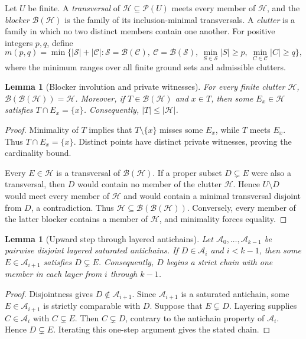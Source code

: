 \documentclass[a4paper,fleqn,longmktitle]{cas-sc}
\newtheorem{lemma}[theorem]{Lemma}
\theoremstyle{definition}
\theoremstyle{remark}
\newcommand{\powerset}{\mathcal{P}}
\newcommand{\blocker}{\mathcal{B}}
\begin{document}
Let $U$ be finite.  A \emph{transversal} of
$\mathcal H\subseteq\powerset(U)$ meets every member of $\mathcal H$, and the
\emph{blocker} $\blocker(\mathcal H)$ is the family of its inclusion-minimal
transversals.  A \emph{clutter} is a family in which no two distinct members
contain one another.  For positive integers $p,q$, define
\[
  m(p,q)=\min\bigl\{|\mathcal S|+|\mathcal C|:
  \mathcal S=\blocker(\mathcal C),\
  \mathcal C=\blocker(\mathcal S),\
  \min_{S\in\mathcal S}|S|\geq p,\
  \min_{C\in\mathcal C}|C|\geq q\bigr\},
\]
where the minimum ranges over all finite ground sets and admissible clutters.

\begin{lemma}[Blocker involution and private witnesses]
\label{lem:blocker-basic}
For every finite clutter $\mathcal H$,
$\blocker(\blocker(\mathcal H))=\mathcal H$.  Moreover, if
$T\in\blocker(\mathcal H)$ and $x\in T$, then some
$E_x\in\mathcal H$ satisfies $T\cap E_x=\{x\}$.  Consequently,
$|T|\leq|\mathcal H|$.
\end{lemma}

\begin{proof}
Minimality of $T$ implies that $T\setminus\{x\}$ misses some $E_x$, while
$T$ meets $E_x$.  Thus $T\cap E_x=\{x\}$.  Distinct points have distinct
private witnesses, proving the cardinality bound.

Every $E\in\mathcal H$ is a transversal of $\blocker(\mathcal H)$.  If a
proper subset $D\subsetneq E$ were also a transversal, then $D$ would contain
no member of the clutter $\mathcal H$.  Hence $U\setminus D$ would meet every
member of $\mathcal H$ and would contain a minimal transversal disjoint from
$D$, a contradiction.  Thus
$\mathcal H\subseteq\blocker(\blocker(\mathcal H))$.  Conversely, every
member of the latter blocker contains a member of $\mathcal H$, and
minimality forces equality.
\end{proof}

\begin{lemma}[Upward step through layered antichains]
\label{lem:upward-step}
Let $\mathcal A_0,\ldots,\mathcal A_{k-1}$ be pairwise disjoint layered
saturated antichains.  If $D\in\mathcal A_i$ and $i<k-1$, then some
$E\in\mathcal A_{i+1}$ satisfies $D\subsetneq E$.  Consequently, $D$ begins
a strict chain with one member in each layer from $i$ through $k-1$.
\end{lemma}

\begin{proof}
Disjointness gives $D\notin\mathcal A_{i+1}$.  Since
$\mathcal A_{i+1}$ is a saturated antichain, some
$E\in\mathcal A_{i+1}$ is strictly comparable with $D$.  Suppose that
$E\subsetneq D$.  Layering supplies $C\in\mathcal A_i$ with
$C\subsetneq E$.  Then $C\subsetneq D$, contrary to the antichain property
of $\mathcal A_i$.  Hence $D\subsetneq E$.  Iterating this one-step argument
gives the stated chain.
\end{proof}
\end{document}
